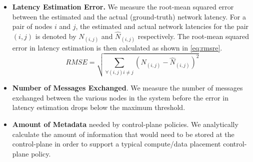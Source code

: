 \begin{itemize}
\item \textbf{Latency Estimation Error.} We measure the root-mean squared error between the estimated and the actual (ground-truth) network latency. For a pair of nodes $i$ and $j$, the estimated and actual network latencies for the pair $\left( i, j\right)$ is denoted by $N_{\left( i, j\right)}$ and $\hat{N}_{\left( i, j\right)}$ respectively. The root-mean squared error in latency estimation is then calculated as shown in \cref{eq:rmsre}.
\begin{equation}
\label{eq:rmsre}
RMSE = \sqrt{\sum_{\forall \left(i, j \right) i \neq j}{\left(N_{\left( i, j\right)} - \hat{N}_{\left( i, j\right)}\right)^2}}
\end{equation}
\item \textbf{Number of Messages Exchanged}. We measure the number of messages exchanged between the various nodes in the system before the error in latency estimation drops below the maximum threshold.
\item \textbf{Amount of Metadata} needed by control-plane policies. We analytically calculate the amount of information that would need to be stored at the control-plane in order to support a typical compute/data placement control-plane policy.
\end{itemize}

